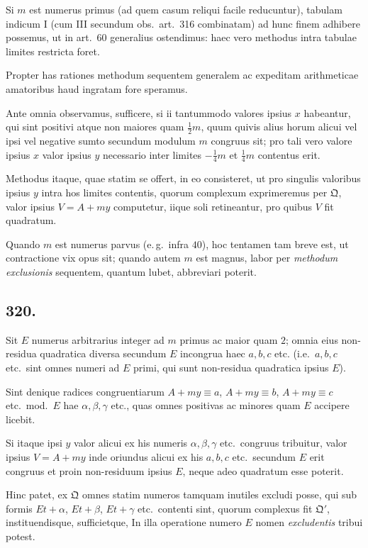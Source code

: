 \documentclass[12pt,a4paper]{article}
\theoremstyle{plain}
\theoremstyle{definition}
\theoremstyle{remark}
\begin{document}
Si $m$ est numerus primus (ad quem casum reliqui facile reducuntur), tabulam
indicum I (cum III secundum obs.\ art.\@~316 combinatam) ad hunc finem
adhibere possemus, ut in art.\@~60 generalius ostendimus: haec vero methodus
intra tabulae limites restricta foret.

Propter has rationes methodum sequentem generalem ac expeditam arithmeticae
amatoribus haud ingratam fore speramus.

Ante omnia observamus, sufficere, si ii tantummodo valores ipsius $x$ habeantur,
qui sint positivi atque non maiores quam $\tfrac{1}{2}m$, quum quivis alius horum alicui
vel ipsi vel negative sumto secundum modulum $m$ congruus sit; pro tali vero
valore ipsius $x$ valor ipsius $y$ necessario inter limites $-\tfrac{1}{4}m$ et $\tfrac{1}{4}m$
contentus erit.

Methodus itaque, quae statim se offert, in eo consisteret, ut pro singulis
valoribus ipsius $y$ intra hos limites contentis, quorum complexum exprimeremus
per $\mathfrak{Q}$, valor ipsius $V = A + my$ computetur, iique soli retineantur, pro quibus
$V$ fit quadratum.

Quando $m$ est numerus parvus (e.\,g.\ infra $40$), hoc tentamen tam breve
est, ut contractione vix opus sit; quando autem $m$ est magnus, labor per
\emph{methodum exclusionis} sequentem, quantum lubet, abbreviari poterit.

\subsection*{320.}

Sit $E$ numerus arbitrarius integer ad $m$ primus ac maior quam $2$; omnia
eius non-residua quadratica diversa secundum $E$ incongrua haec $a, b, c$ etc.
(i.e.\ $a, b, c$ etc.\ sint omnes numeri ad $E$ primi, qui sunt non-residua quadratica
ipsius $E$).

Sint denique radices congruentiarum $A + my \equiv a$, $A + my \equiv b$,
$A + my \equiv c$ etc.\ mod.\ $E$ hae $\alpha, \beta, \gamma$ etc., quas omnes positivas ac
minores quam $E$ accipere licebit.

Si itaque ipsi $y$ valor alicui ex his numeris $\alpha, \beta, \gamma$ etc.\ congruus
tribuitur, valor ipsius $V = A + my$ inde oriundus alicui ex his $a, b, c$ etc.\ secundum
$E$ erit congruus et proin non-residuum ipsius $E$, neque adeo quadratum esse
poterit.

Hinc patet, ex $\mathfrak{Q}$ omnes statim numeros tamquam inutiles excludi posse, qui
sub formis $Et + \alpha$, $Et + \beta$, $Et + \gamma$ etc.\ contenti sint, quorum complexus fit
$\mathfrak{Q}'$, instituendisque, sufficietque, In illa operatione numero $E$ nomen
\emph{excludentis} tribui potest.
\end{document}

